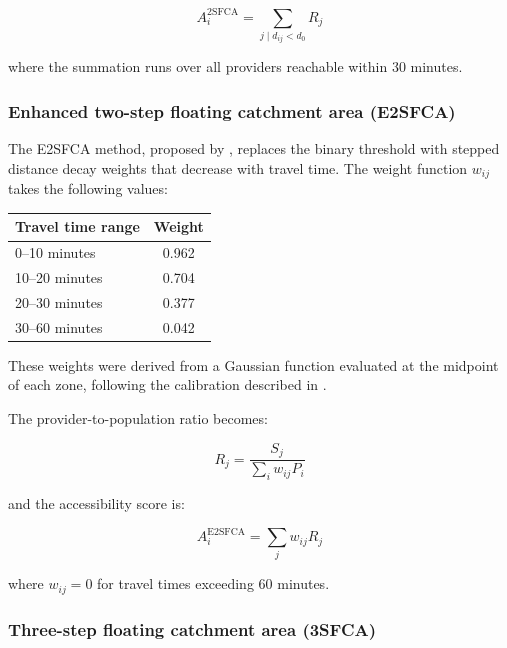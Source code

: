 \documentclass{CUP-JNL-DAP}%
\begin{document}
\begin{equation}
A_i^{\text{2SFCA}} = \sum_{j \mid d_{ij} < d_0} R_j
\end{equation}

\noindent where the summation runs over all providers reachable within 30 minutes.

\subsubsection{Enhanced two-step floating catchment area (E2SFCA)}

The E2SFCA method, proposed by \citet{luo2009}, replaces the binary threshold with stepped distance decay weights that decrease with travel time. The weight function $w_{ij}$ takes the following values:

\begin{table}[ht]
\centering
\small
\begin{tabular}{lc}
\toprule
Travel time range & Weight \\
\midrule
0--10 minutes & 0.962 \\
10--20 minutes & 0.704 \\
20--30 minutes & 0.377 \\
30--60 minutes & 0.042 \\
\bottomrule
\end{tabular}
\end{table}

\noindent These weights were derived from a Gaussian function evaluated at the midpoint of each zone, following the calibration described in \citet{luo2009}.

The provider-to-population ratio becomes:

\begin{equation}
R_j = \frac{S_j}{\displaystyle\sum_i w_{ij} P_i}
\end{equation}

\noindent and the accessibility score is:

\begin{equation}
A_i^{\text{E2SFCA}} = \sum_j w_{ij} R_j
\end{equation}

\noindent where $w_{ij} = 0$ for travel times exceeding 60 minutes.

\subsubsection{Three-step floating catchment area (3SFCA)}
\end{document}
